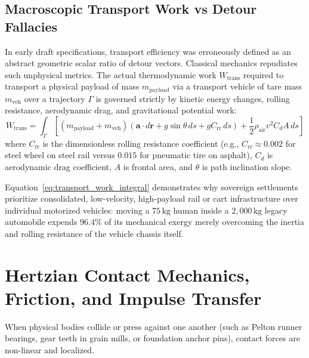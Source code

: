 \subsection{Macroscopic Transport Work vs Detour Fallacies}
In early draft specifications, transport efficiency was erroneously defined as an abstract geometric scalar ratio of detour vectors. Classical mechanics repudiates such unphysical metrics. The actual thermodynamic work $W_{\mathrm{trans}}$ required to transport a physical payload of mass $m_{\mathrm{payload}}$ via a transport vehicle of tare mass $m_{\mathrm{veh}}$ over a trajectory $\Gamma$ is governed strictly by kinetic energy changes, rolling resistance, aerodynamic drag, and gravitational potential work:
\begin{equation}
W_{\mathrm{trans}} = \int_{\Gamma} \left[ (m_{\mathrm{payload}} + m_{\mathrm{veh}}) \left( \mathbf{a} \cdot d\mathbf{r} + g \sin\theta \, ds + g C_{\mathrm{rr}} \, ds \right) + \frac{1}{2} \rho_{\mathrm{air}} v^2 C_d A \, ds \right]
\label{eq:transport_work_integral}
\end{equation}
where $C_{\mathrm{rr}}$ is the dimensionless rolling resistance coefficient (e.g., $C_{\mathrm{rr}} \approx 0.002$ for steel wheel on steel rail versus $0.015$ for pneumatic tire on asphalt), $C_d$ is aerodynamic drag coefficient, $A$ is frontal area, and $\theta$ is path inclination slope.

Equation~\eqref{eq:transport_work_integral} demonstrates why sovereign settlements prioritize consolidated, low-velocity, high-payload rail or cart infrastructure over individual motorized vehicles: moving a $75\,\mathrm{kg}$ human inside a $2,000\,\mathrm{kg}$ legacy automobile expends $96.4\%$ of its mechanical exergy merely overcoming the inertia and rolling resistance of the vehicle chassis itself.

\section{Hertzian Contact Mechanics, Friction, and Impulse Transfer}
\label{sec:mech_contact}

When physical bodies collide or press against one another (such as Pelton runner bearings, gear teeth in grain mills, or foundation anchor pins), contact forces are non-linear and localized.

